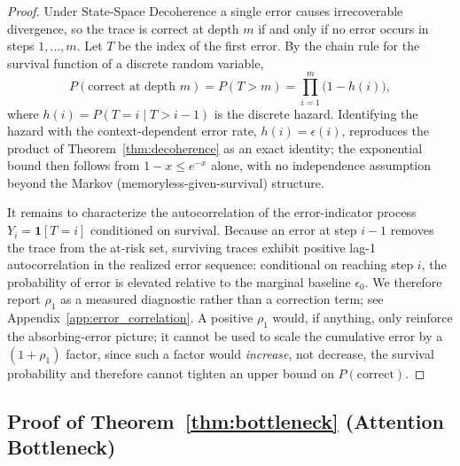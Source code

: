 \documentclass{article}
\theoremstyle{plain}
\theoremstyle{definition}
\theoremstyle{remark}
\begin{document}
\begin{proof}
Under State-Space Decoherence a single error causes irrecoverable divergence, so the trace is correct at depth $m$ if and only if no error occurs in steps $1,\dots,m$. Let $T$ be the index of the first error. By the chain rule for the survival function of a discrete random variable,
\begin{equation}
P(\text{correct at depth } m) = P(T > m) = \prod_{i=1}^{m} \big(1 - h(i)\big),
\end{equation}
where $h(i) = P(T = i \mid T > i-1)$ is the discrete hazard. Identifying the hazard with the context-dependent error rate, $h(i) = \epsilon(i)$, reproduces the product of Theorem~\ref{thm:decoherence} as an exact identity; the exponential bound then follows from $1-x \leq e^{-x}$ alone, with no independence assumption beyond the Markov (memoryless-given-survival) structure.

It remains to characterize the autocorrelation of the error-indicator process $Y_i = \mathbf{1}[T = i]$ conditioned on survival. Because an error at step $i-1$ removes the trace from the at-risk set, surviving traces exhibit positive lag-1 autocorrelation in the realized error sequence: conditional on reaching step $i$, the probability of error is elevated relative to the marginal baseline $\epsilon_0$. We therefore report $\rho_1$ as a measured diagnostic rather than a correction term; see Appendix~\ref{app:error_correlation}. A positive $\rho_1$ would, if anything, only reinforce the absorbing-error picture; it cannot be used to scale the cumulative error by a $(1+\rho_1)$ factor, since such a factor would \emph{increase}, not decrease, the survival probability and therefore cannot tighten an upper bound on $P(\text{correct})$.
\end{proof}

\subsection{Proof of Theorem~\ref{thm:bottleneck} (Attention Bottleneck)}
\label{app:bottleneck_proof}
\end{document}
